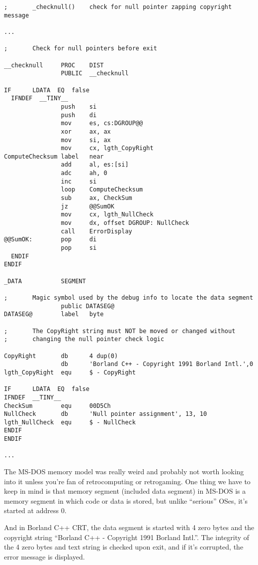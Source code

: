 \begin{lstlisting}[style=customasmx86]
;       _checknull()    check for null pointer zapping copyright message

...

;       Check for null pointers before exit

__checknull     PROC    DIST
                PUBLIC  __checknull

IF      LDATA  EQ  false
  IFNDEF  __TINY__
                push    si
                push    di
                mov     es, cs:DGROUP@@
                xor     ax, ax
                mov     si, ax
                mov     cx, lgth_CopyRight
ComputeChecksum label   near
                add     al, es:[si]
                adc     ah, 0
                inc     si
                loop    ComputeChecksum
                sub     ax, CheckSum
                jz      @@SumOK
                mov     cx, lgth_NullCheck
                mov     dx, offset DGROUP: NullCheck
                call    ErrorDisplay
@@SumOK:        pop     di
                pop     si
  ENDIF
ENDIF

_DATA           SEGMENT

;       Magic symbol used by the debug info to locate the data segment
                public DATASEG@
DATASEG@        label   byte

;       The CopyRight string must NOT be moved or changed without
;       changing the null pointer check logic

CopyRight       db      4 dup(0)
                db      'Borland C++ - Copyright 1991 Borland Intl.',0
lgth_CopyRight  equ     $ - CopyRight

IF      LDATA  EQ  false
IFNDEF  __TINY__
CheckSum        equ     00D5Ch
NullCheck       db      'Null pointer assignment', 13, 10
lgth_NullCheck  equ     $ - NullCheck
ENDIF
ENDIF

...

\end{lstlisting}

The MS-DOS memory model was really weird and probably not worth looking into it unless you're fan of retrocomputing or retrogaming.
One thing we have to keep in mind is that memory segment (included data segment) in MS-DOS is a memory segment in which code or data is stored,
but unlike ``serious'' \ac{OS}es, it's started at address 0.

And in Borland C++ \ac{CRT}, the data segment is started with 4 zero bytes and the copyright string ``Borland C++ - Copyright 1991 Borland Intl.''.
The integrity of the 4 zero bytes and text string is checked upon exit, and if it's corrupted, the error message is displayed.

